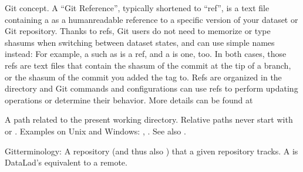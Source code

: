 \begin{description}
\ignorespaces 
\sphinxAtStartPar
Git concept. A “Git Reference”, typically shortened to “ref”, is a text file containing a {\hyperref[\detokenize{glossary:term-commit}]{}} {\hyperref[\detokenize{glossary:term-shasum}]{}} as a human\sphinxhyphen{}readable reference to a specific version of your dataset or Git repository. Thanks to refs, Git users do not need to memorize or type shasums when switching between dataset states, and can use simple names instead: For example, a {\hyperref[\detokenize{glossary:term-branch}]{}} such as  is a ref, and a {\hyperref[\detokenize{glossary:term-tag}]{}} is one, too. In both cases, those refs are text files that contain the shasum of the commit at the tip of a branch, or the shasum of the commit you added the tag to. Refs are organized in the directory  and Git commands and configurations can use refs to perform updating operations or determine their behavior. More details can be found at 

\ignorespaces 
\sphinxAtStartPar
A path related to the present working directory. Relative paths never start with \sphinxcode{\sphinxupquote{/}} or \sphinxcode{\sphinxupquote{\textbackslash{}}}.
Examples on Unix and Windows: , . See also {\hyperref[\detokenize{glossary:term-absolute-path}]{}}.

\ignorespaces 
\sphinxAtStartPar
Git\sphinxhyphen{}terminology: A repository (and thus also {\hyperref[\detokenize{glossary:term-DataLad-dataset}]{}}) that a given repository
tracks. A {\hyperref[\detokenize{glossary:term-sibling}]{}} is DataLad’s equivalent to a remote.


\end{description}
